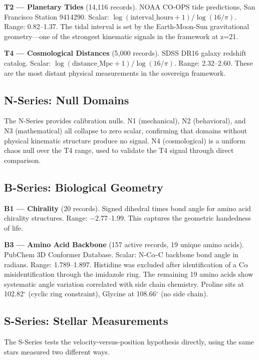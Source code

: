 \documentclass[11pt, letterpaper, openany]{book}
\begin{document}
\textbf{T2 --- Planetary Tides} (14,116 records). NOAA CO-OPS tide predictions, San Francisco
Station 9414290. Scalar: $\log(\text{interval\_hours} + 1)/\log(16/\pi)$. Range: 0.82--1.37.
The tidal interval is set by the Earth-Moon-Sun gravitational geometry---one of the strongest
kinematic signals in the framework at z=21.

\textbf{T4 --- Cosmological Distances} (5,000 records). SDSS DR16 galaxy redshift catalog.
Scalar: $\log(\text{distance\_Mpc} + 1)/\log(16/\pi)$. Range: 2.32--2.60. These are the
most distant physical measurements in the sovereign framework.

\subsection*{N-Series: Null Domains}

The N-Series provides calibration nulls. N1 (mechanical), N2 (behavioral), and N3
(mathematical) all collapse to zero scalar, confirming that domains without physical kinematic
structure produce no signal. N4 (cosmological) is a uniform chaos null over the T4 range,
used to validate the T4 signal through direct comparison.

\subsection*{B-Series: Biological Geometry}

\textbf{B1 --- Chirality} (20 records). Signed dihedral times bond angle for amino acid
chirality structures. Range: $-$2.77--1.99. This captures the geometric handedness of life.

\textbf{B3 --- Amino Acid Backbone} (157 active records, 19 unique amino acids). PubChem 3D
Conformer Database. Scalar: N-C$\alpha$-C backbone bond angle in radians. Range:
1.789--1.897. Histidine was excluded after identification of a C$\alpha$ misidentification
through the imidazole ring. The remaining 19 amino acids show systematic angle variation
correlated with side chain chemistry. Proline sits at 102.82$^\circ$ (cyclic ring
constraint), Glycine at 108.66$^\circ$ (no side chain).

\subsection*{S-Series: Stellar Measurements}

The S-Series tests the velocity-versus-position hypothesis directly, using the same stars measured
two different ways.
\end{document}
